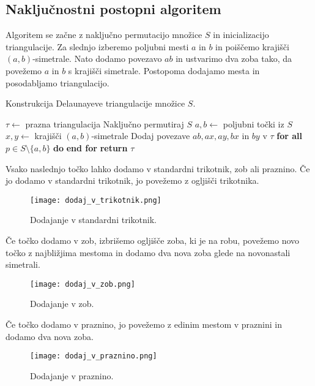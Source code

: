 \documentclass{article}
\begin{document}
\subsection{Naključnostni postopni algoritem}
Algoritem se začne z naključno permutacijo množice $S$ in inicializacijo triangulacije. Za slednjo izberemo poljubni mesti $a$ in $b$ in poiščemo krajišči $(a, b)$-simetrale. Nato dodamo povezavo $ab$ in ustvarimo dva zoba tako, da povežemo $a$ in $b$ s krajišči simetrale. Postopoma dodajamo mesta in posodabljamo triangulacijo.
\begin{algorithm}
    \caption{Konstrukcija Delaunayeve triangulacije množice $S$.}
    \label{alg:delaunay}
    \begin{algorithmic}
        \State $\tau \leftarrow$ prazna triangulacija
        \State Naključno permutiraj $S$
        \State $a, b \leftarrow$ poljubni točki iz $S$
        \State $x, y \leftarrow$ krajišči $(a, b)$-simetrale
        \State Dodaj povezave $ab, ax, ay, bx$ in $by$ v $\tau$
        \State \textbf{for all} $p \in S \setminus \{ a, b \}$ \textbf{do}
        \State \qquad {}  
        \State \textbf{end for}
        \State \textbf{return} $\tau$
    \EndProcedure
    \end{algorithmic}
\end{algorithm}

Vsako naslednjo točko lahko dodamo v standardni trikotnik, zob ali praznino. Če jo dodamo v standardni trikotnik, jo povežemo z ogljišči trikotnika.
\begin{figure}[h!]
   \centering
   \texttt{[image: dodaj\_v\_trikotnik.png]}
   \caption{Dodajanje v standardni trikotnik.}
   \label{dodaj_tri}
\end{figure}
Če točko dodamo v zob, izbrišemo ogljišče zoba, ki je na robu, povežemo novo točko z najbližjima mestoma in dodamo dva nova zoba glede na novonastali simetrali.
\begin{figure}[h!]
   \centering
   \texttt{[image: dodaj\_v\_zob.png]}
   \caption{Dodajanje v zob.}
   \label{dodaj_zob}
\end{figure}
Če točko dodamo v praznino, jo povežemo z edinim mestom v praznini in dodamo dva nova zoba.
\begin{figure}[h!]
   \centering
   \texttt{[image: dodaj\_v\_praznino.png]}
   \caption{Dodajanje v praznino.}
   \label{dodaj_praz}
\end{figure}
\end{document}
